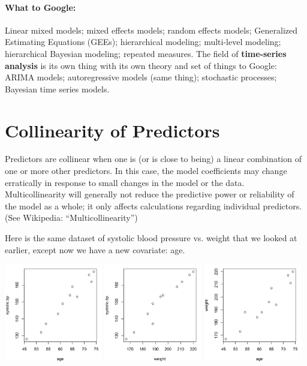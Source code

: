 \paragraph{What to Google:} Linear mixed models; mixed effects models; random effects models; Generalized Estimating Equations (GEEs); hierarchical modeling; multi-level modeling; hierarchical Bayesian modeling; repeated measures. The field of \textbf{time-series analysis} is its own thing with its own theory and set of things to Google: ARIMA models; autoregressive models (same thing); stochastic processes; Bayesian time series models.

\newpage


\section{Collinearity of Predictors}

Predictors are collinear when one is (or is close to being) a linear combination of one or more other predictors. In this case, the model coefficients may change erratically in response to small changes in the model or the data. Multicollinearity will generally not reduce the predictive power or reliability of the model as a whole; it only affects calculations regarding individual predictors. (See Wikipedia: ``Multicollinearity'')

Here is the same dataset of systolic blood pressure vs. weight that we looked at earlier, except now we have a new covariate: age.

\begin{center}
\includegraphics[width=0.32\textwidth]{img/sample-systolic-bp-1.png}
\includegraphics[width=0.32\textwidth]{img/systolic-bp-simple-plot.png}
\includegraphics[width=0.32\textwidth]{img/sample-systolic-bp-3.png}
\end{center}

